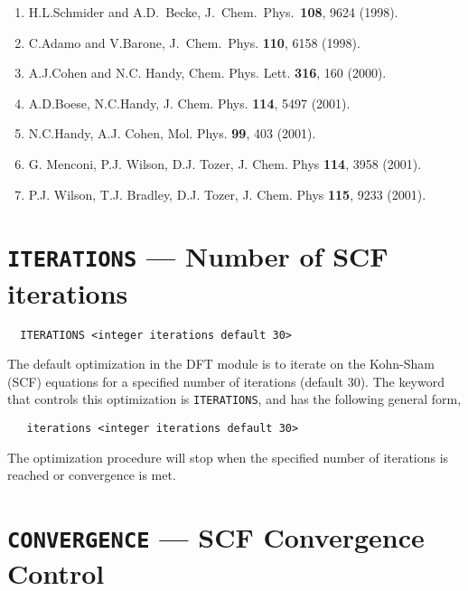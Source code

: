 {\begin{enumerate}
\item  H.L.Schmider and A.D.~Becke, J.~Chem.~Phys.~{\bf 108},
9624 (1998). \\
\item C.Adamo and V.Barone, J.~Chem.~Phys. {\bf 110}, 6158 (1998).\\
\item  A.J.Cohen and N.C. Handy, Chem. Phys. Lett. {\bf 316}, 160 (2000).\\
\item  A.D.Boese,  N.C.Handy, J. Chem. Phys. {\bf 114}, 5497
(2001). \\
\item  N.C.Handy, A.J. Cohen, Mol. Phys. {\bf 99}, 403 (2001).\\
\item G. Menconi, P.J. Wilson, D.J. Tozer, J. Chem. Phys {\bf 114}, 3958 (2001).\\
\item  P.J. Wilson, T.J. Bradley, D.J. Tozer,  J. Chem. Phys {\bf 115}, 9233 (2001).


\end{enumerate}
}
\onecolumn

\section{{\tt ITERATIONS} --- Number of SCF iterations}

\begin{verbatim}
  ITERATIONS <integer iterations default 30>
\end{verbatim}

The default optimization in the DFT module is to iterate on the 
Kohn-Sham (SCF) equations for a specified number of iterations
(default 30).  The keyword that controls this optimization 
is \verb+ITERATIONS+, and has the following general form,

\begin{verbatim}
   iterations <integer iterations default 30>
\end{verbatim}

The optimization procedure will stop when the specified number of
iterations is reached or convergence is met.

\section{{\tt CONVERGENCE} --- SCF Convergence Control}
\label{sec:dftconv}

